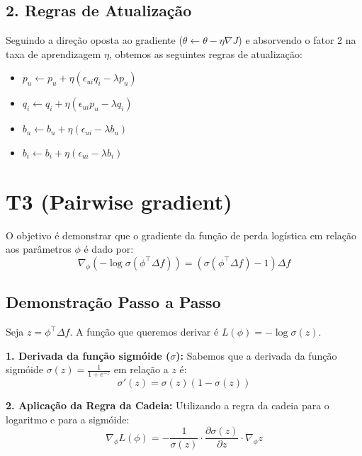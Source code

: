 \subsection*{2. Regras de Atualização}
Seguindo a direção oposta ao gradiente ($\theta \leftarrow \theta - \eta \nabla J$) e absorvendo o fator 2 na taxa de aprendizagem $\eta$, obtemos as seguintes regras de atualização:
\begin{itemize}
    \item $p_u \leftarrow p_u + \eta (\epsilon_{ui} q_i - \lambda p_u)$
    \item $q_i \leftarrow q_i + \eta (\epsilon_{ui} p_u - \lambda q_i)$
    \item $b_u \leftarrow b_u + \eta (\epsilon_{ui} - \lambda b_u)$
    \item $b_i \leftarrow b_i + \eta (\epsilon_{ui} - \lambda b_i)$
\end{itemize}





\section*{T3 (Pairwise gradient)}

O objetivo é demonstrar que o gradiente da função de perda logística em relação aos parâmetros $\phi$ é dado por:
\begin{equation}
\nabla_{\phi} \left( -\log \sigma(\phi^\top \Delta f) \right) = \left( \sigma(\phi^\top \Delta f) - 1 \right) \Delta f
\end{equation}

\subsection*{Demonstração Passo a Passo}

Seja $z = \phi^\top \Delta f$. A função que queremos derivar é $L(\phi) = -\log \sigma(z)$.

\textbf{1. Derivada da função sigmóide ($\sigma$):}
Sabemos que a derivada da função sigmóide $\sigma(z) = \frac{1}{1 + e^{-z}}$ em relação a $z$ é:
\begin{equation}
\sigma'(z) = \sigma(z)(1 - \sigma(z))
\end{equation}

\textbf{2. Aplicação da Regra da Cadeia:}
Utilizando a regra da cadeia para o logaritmo e para a sigmóide:
\begin{equation}
\nabla_{\phi} L(\phi) = -\frac{1}{\sigma(z)} \cdot \frac{\partial \sigma(z)}{\partial z} \cdot \nabla_{\phi} z
\end{equation}

